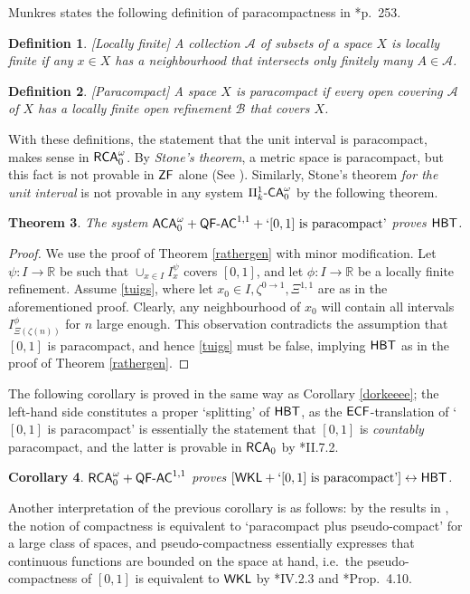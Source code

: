 \documentclass[reqno]{amsart}
\newtheorem{thm}{Theorem}
\newtheorem{cor}[thm]{Corollary}
\newtheorem{defi}[thm]{Definition}
\def\bdefi{\begin{defi}\rm}
\def\edefi{\end{defi}}
\def\SIXK{\Pi_{k}^{1}\text{-\textsf{\textup{CA}}}_{0}^{\omega}}
\def\ZF{\textup{\textsf{ZF}}}
\def\RCA{\textup{\textsf{RCA}}}
\def\RCAo{\textup{\textsf{RCA}}_{0}^{\omega}}
\def\ACAo{\textup{\textsf{ACA}}_{0}^{\omega}}
\def\WKL{\textup{\textsf{WKL}}}
\def\R{{\mathbb  R}}
\def\di{\rightarrow}
\def\asa{\leftrightarrow}
\def\QFAC{\textup{\textsf{QF-AC}}}
\def\HBT{\textup{\textsf{HBT}}}
\def\ECF{\textup{\textsf{ECF}}}
\numberwithin{equation}{section}
\numberwithin{thm}{section}
\begin{document}
Munkres states the following definition of paracompactness in \cite{munkies}*{p.\ 253}.  
\bdefi[Locally finite]
A collection $\mathcal{A}$ of subsets of a space $X$ is \emph{locally finite} if any $x\in X$ has a neighbourhood that intersects only finitely many $A\in \mathcal{A}$.
\edefi
\bdefi[Paracompact]
A space $X$ is \emph{paracompact} if every open covering $\mathcal{A}$ of $X$ has a locally
finite open refinement $\mathcal{B}$ that covers $X$.
\edefi
With these definitions, the statement that the unit interval is paracompact, makes sense in $\RCAo$.  
By \emph{Stone's theorem}, a metric space is paracompact, but this fact is not provable in $\ZF$ alone (See \cite{goodgoing}).  
Similarly, Stone's theorem \emph{for the unit interval} is not provable in any system $\SIXK$ by the following theorem.
\begin{thm}\label{paramaeremki}
The system $\ACAo+\QFAC^{1,1}+ \textup{`$[0,1]$ is paracompact'}$ proves $\HBT$. 
\end{thm}
\begin{proof}
We use the proof of Theorem \ref{rathergen} with minor modification.
Let $\psi:I\di \R$ be such that $\cup_{x\in I}I_{x}^{\psi}$ covers $[0, 1]$, and let $\phi:I\di \R$ be a locally finite refinement. %
Assume \eqref{tuigs}, where let $x_{0}\in I,\zeta^{0\di 1}, \Xi^{1,1}$ are as in the aforementioned proof.    
Clearly, any neighbourhood of $x_{0}$ will contain all intervals $I^{\phi}_{\Xi(\zeta(n))}$ for $n$ large enough.  
This observation contradicts the assumption that $[0,1]$ is paracompact, and hence \eqref{tuigs} must be false, implying $\HBT$ as in the proof of Theorem \ref{rathergen}.  
\end{proof}
The following corollary is proved in the same way as Corollary \ref{dorkeeee}; the left-hand side constitutes a proper `splitting' of $\HBT$, as the $\ECF$-translation of `$[0,1]$ is paracompact' is essentially the statement that $[0,1]$ is \emph{countably} paracompact, and the latter is provable in $\RCA_{0}$ by \cite{simpson2}*{II.7.2}.
\begin{cor}\label{XYW}
 $\RCAo+\QFAC^{1,1}$ proves $[\WKL + \textup{`$[0,1]$ is paracompact'}]\asa \HBT$. 
\end{cor}
Another interpretation of the previous corollary is as follows: by the results in \cite{wienszoon}, the notion of compactness is equivalent to `paracompact plus pseudo-compact' for a large class of spaces, and pseudo-compactness essentially expresses that continuous functions are bounded on the space at hand, i.e.\ the pseudo-compactness of $[0,1]$ is equivalent to $\WKL$ by \cite{simpson2}*{IV.2.3} and \cite{kohlenbach4}*{Prop.\ 4.10}. 
\end{document}
